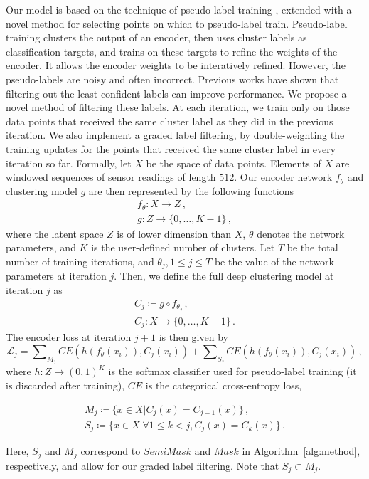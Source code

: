 \documentclass[wcp]{jmlr}
\begin{document}
Our model is based on the technique of pseudo-label training \citep{caron2018deep}, extended with a novel method for selecting points on which to pseudo-label train. Pseudo-label training clusters the output of an encoder, then uses cluster labels as classification targets, and trains on these targets to refine the weights of the encoder. It allows the encoder weights to be interatively refined. However, the pseudo-labels are noisy and often incorrect. Previous works \citep{mahon2021selective,mrabah2020deep} have shown that filtering out the least confident labels can improve performance. We propose a novel method of filtering these labels. At each iteration, we train only on those data points that received the same cluster label as they did in the previous iteration.
We also implement a graded label filtering, by double-weighting the training updates for the points that received the same cluster label in every iteration so far. Formally, let $X$ be the space of data points. Elements of $X$ are windowed sequences of sensor readings of length $512$. Our encoder network $f_\theta$ and clustering model $g$ are then represented by the following functions 
\begin{gather*}
    f_\theta: X \rightarrow Z\,, \\
    g: Z \rightarrow \{0, \dots, K-1\} \,,
\end{gather*}
where the latent space $Z$ is of lower dimension than $X$, $\theta$ denotes the network parameters, and $K$ is the user-defined number of clusters. Let $T$ be the total number of training iterations, and $\theta_j, 1 \leq j \leq T$ be the value of the network parameters at iteration $j$. Then, we define the full deep clustering model at iteration $j$ as
\begin{gather*}
    C_j \coloneqq g \circ f_{\theta_j}\,, \\
    C_j: X \rightarrow \{0, \dots, K-1\}\,.
\end{gather*}
The encoder loss at iteration $j+1$ is then given by
\begin{equation*}
    \mathcal{L}_j = \sum\nolimits_{M_j} \mathit{CE}(h(f_{\theta}(x_i)),C_j(x_i)) + \sum\nolimits_{S_j} \mathit{CE}(h(f_{\theta}(x_i)),C_j(x_i))\,,
\end{equation*}
where $h: Z \rightarrow (0,1)^K$ is the softmax classifier used for pseudo-label training (it is discarded after training), $\mathit{CE}$ is the categorical cross-entropy loss, 
\begin{spreadlines}{10pt}
\begin{gather*}
    M_j \coloneqq \{x \in X | C_j(x) = C_{j-1}(x)\}\,, \\
    S_j \coloneqq \{x \in X | \forall 1 \leq k < j, C_j(x) = C_{k}(x)\}\,.
\end{gather*}
\end{spreadlines}
Here, $S_j$ and $M_j$ correspond to $SemiMask$ and $Mask$ in Algorithm~\ref{alg:method}, respectively, and allow for our graded label filtering. Note that $S_j \subset M_j$.
\end{document}
